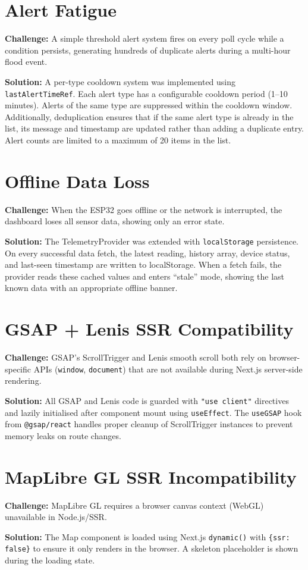 \section{Alert Fatigue}

\textbf{Challenge:} A simple threshold alert system fires on every poll cycle while a condition persists, generating hundreds of duplicate alerts during a multi-hour flood event.

\textbf{Solution:} A per-type cooldown system was implemented using \texttt{lastAlertTimeRef}. Each alert type has a configurable cooldown period (1--10 minutes). Alerts of the same type are suppressed within the cooldown window. Additionally, deduplication ensures that if the same alert type is already in the list, its message and timestamp are updated rather than adding a duplicate entry. Alert counts are limited to a maximum of 20 items in the list.

\section{Offline Data Loss}

\textbf{Challenge:} When the ESP32 goes offline or the network is interrupted, the dashboard loses all sensor data, showing only an error state.

\textbf{Solution:} The TelemetryProvider was extended with \texttt{localStorage} persistence. On every successful data fetch, the latest reading, history array, device status, and last-seen timestamp are written to localStorage. When a fetch fails, the provider reads these cached values and enters ``stale'' mode, showing the last known data with an appropriate offline banner.

\section{GSAP + Lenis SSR Compatibility}

\textbf{Challenge:} GSAP's ScrollTrigger and Lenis smooth scroll both rely on browser-specific APIs (\texttt{window}, \texttt{document}) that are not available during Next.js server-side rendering.

\textbf{Solution:} All GSAP and Lenis code is guarded with \texttt{"use client"} directives and lazily initialised after component mount using \texttt{useEffect}. The \texttt{useGSAP} hook from \texttt{@gsap/\allowbreak{}react} handles proper cleanup of ScrollTrigger instances to prevent memory leaks on route changes.

\section{MapLibre GL SSR Incompatibility}

\textbf{Challenge:} MapLibre GL requires a browser canvas context (WebGL) unavailable in Node.js/SSR.

\textbf{Solution:} The Map component is loaded using Next.js \texttt{dynamic()} with \texttt{\{ssr: false\}} to ensure it only renders in the browser. A skeleton placeholder is shown during the loading state.
